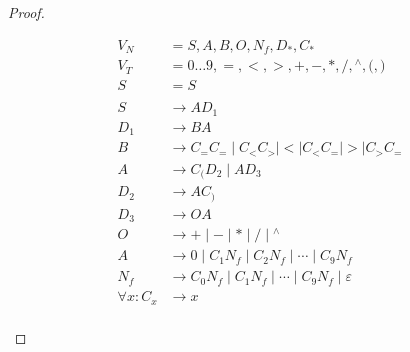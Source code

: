 \documentclass[12pt,a4paper]{article}%
\begin{document}

\begin{proof}
  \leavevmode 
  \begin{center}
    \begin{align*}
      V_N &= S, A, B, O, N_f, D_*, C_*\\
      V_T &= 0 \ldots 9, {=}, {<}, {>}, +, -, *, /, {^\land}, {(}, {)}\\
      S &= S\\
      \\
      S &\to A D_1\\
      D_1 &\to B A\\
      B &\to C_{=} C_{=} \mid C_{<} C_{>} \mid {<} \mid C_{<} C_{=} \mid {>} \mid C_{>} C_{=}\\
      A &\to C_{(} D_2 \mid A D_3\\
      D_2 &\to A C_)\\
      D_3 &\to O A\\
      O &\to {+} \mid {-} \mid {*} \mid {/} \mid {^\land}\\
      A &\to 0 \mid C_1 N_f \mid C_2 N_f \mid \cdots \mid C_9 N_f\\
      N_f &\to C_0 N_f \mid C_1 N_f \mid \cdots \mid C_9 N_f \mid \varepsilon\\
      \forall x: C_x &\to x\\
    \end{align*}
  \end{center}
\end{proof}

\end{document}
